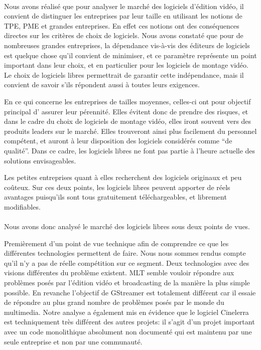 \paragraph{}

Nous avons réalisé que pour analyser le marché des logiciels
d'édition vidéo, il convient de distinguer les entreprises par leur
taille en utilisant les notions de TPE, PME et grandes entreprises. En
effet ces notions ont des conséquences directes sur les critères
de choix de logiciels.  Nous avons constaté que pour de
nombreuses  grandes entreprises, la dépendance vis-à-vis des éditeurs
de logiciels est quelque chose qu'il convient de minimiser, et ce
paramètre représente un point important dans leur choix,
et en particulier pour les logiciels de montage vidéo.
Le choix de logiciels libres permettrait de garantir cette indépendance, mais il
convient de savoir s'ils répondent aussi à toutes leurs exigences.

En ce qui concerne les entreprises de tailles moyennes, celles-ci ont pour objectif principal d'
assurer leur pérennité. Elles évitent donc de prendre des risques,
et dans le cadre du choix de logiciels de montage vidéo, elles iront
souvent vers des produits leaders sur le marché. Elles trouveront ainsi
plus facilement du personnel compétent, et auront à leur disposition
des logiciels considérés comme ``de qualité''. Dans ce cadre, les
logiciels libres ne font pas partie à l'heure actuelle des solutions
envisageables.

Les petites entreprises quant à elles recherchent des logiciels originaux et peu coûteux.
Sur ces deux points, les logiciels libres peuvent apporter de
réels avantages puisqu'ils sont tous gratuitement téléchargeables,
et librement modifiables.


\paragraph{}

Nous avons donc analysé le marché des logiciels libres sous deux points
de vues.

Premièrement d'un point de vue technique afin de comprendre ce que les
différentes technologies permettent de faire.
Nous nous sommes rendus compte qu'il n'y a pas de réelle compétition sur ce segment. Deux
technologies avec des visions différentes du problème existent. MLT
semble vouloir répondre aux problèmes posés par l'édition vidéo
et broadcasting de la manière la plus simple possible. En revanche
l'objectif de GStreamer est totalement différent car il essaie de
répondre au plus grand nombre de problèmes posés par le monde
du multimedia. Notre analyse a également mis en évidence que le logiciel
Cinelerra est techniquement très différent des autres projets: il
s'agit d'un projet important avec un code monolithique
absolument non documenté qui est maintenu par une seule entreprise et
non par une communauté.

